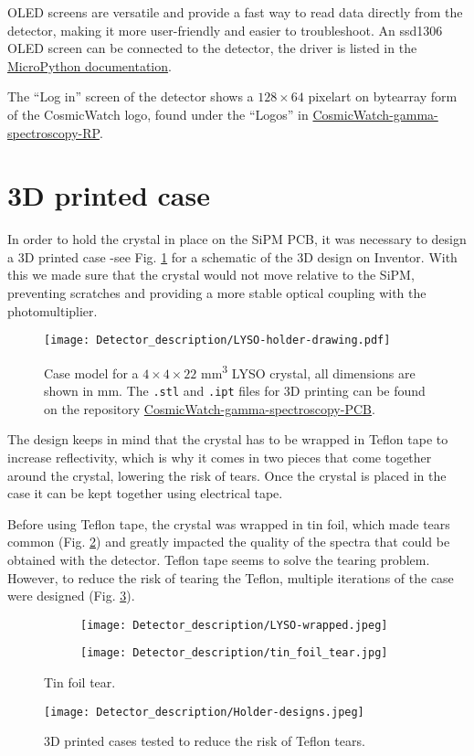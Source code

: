OLED screens are versatile and provide a fast way to read data directly from the detector, making it more user-friendly and easier to troubleshoot. An ssd1306 OLED screen can be connected to the detector, the driver is listed in the \href{https://github.com/micropython/micropython-lib/tree/master/micropython/drivers/display}{MicroPython documentation}.

The ``Log in'' screen of the detector shows a $128\times 64$ pixelart on bytearray form of the CosmicWatch logo, found under the ``Logos'' in \href{https://github.com/anvargasl/CosmicWatch-gamma-spectroscopy-RP}{CosmicWatch-gamma-spectroscopy-RP}.

\section{3D printed case}

In order to hold the crystal in place on the SiPM PCB, it was necessary to design a 3D printed case -see Fig. \ref{fig:3d_case_desing} for a schematic of the 3D design on Inventor. With this we made sure that the crystal would not move relative to the SiPM, preventing scratches and providing a more stable optical coupling with the photomultiplier.

\begin{figure}
    \centering
    \texttt{[image: Detector\_description/LYSO-holder-drawing.pdf]}
    \caption{Case model for a $4\times4\times22$ \unit{mm\cubed} LYSO crystal, all dimensions are shown in \unit{\mm}. The \texttt{.stl} and \texttt{.ipt} files for 3D printing can be found on the repository \href{https://github.com/anvargasl/CosmicWatch-gamma-spectroscopy-PCB}{CosmicWatch-gamma-spectroscopy-PCB}.}
    \label{fig:3d_case_desing}
\end{figure}

The design keeps in mind that the crystal has to be wrapped in Teflon tape to increase reflectivity, which is why it comes in two pieces that come together around the crystal, lowering the risk of tears. Once the crystal is placed in the case it can be kept together using electrical tape.

Before using Teflon tape, the crystal was wrapped in tin foil, which made tears common (Fig. \ref{fig:tin_foil_tear}) and greatly impacted the quality of the spectra that could be obtained with the detector. Teflon tape seems to solve the tearing problem. However, to reduce the risk of tearing the Teflon, multiple iterations of the case were designed (Fig. \ref{fig:3d_previous_desings}).
\begin{figure}
    \centering
    \begin{subfigure}[t]{0.35\textwidth}
      \texttt{[image: Detector\_description/LYSO-wrapped.jpeg]}
    \end{subfigure}
    \begin{subfigure}[t]{0.35\textwidth}
      \texttt{[image: Detector\_description/tin\_foil\_tear.jpg]}
    \end{subfigure}
    \caption{\label{fig:tin_foil_tear}Tin foil tear.}
\end{figure}

\begin{figure}
    \centering
    \texttt{[image: Detector\_description/Holder-designs.jpeg]}
    \caption{3D printed cases tested to reduce the risk of Teflon tears.}
    \label{fig:3d_previous_desings}
\end{figure}
